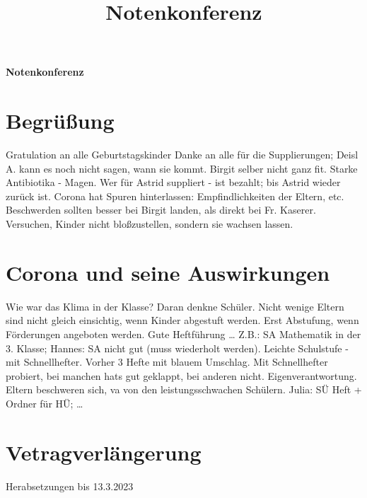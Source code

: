 \documentclass[pdftex,a4paper,12pt,bibliography=totoc]{scrartcl}
\title{Notenkonferenz}
\begin{document}
\begin{center}
 \LARGE
 \textbf{Notenkonferenz}
\end{center}

\normalsize
\section{Begrüßung}
\label{sec:org472ccbb}

Gratulation an alle Geburtstagskinder
\newline
Danke an alle für die Supplierungen; Deisl A. kann es noch nicht sagen, wann sie kommt. Birgit selber nicht ganz fit. Starke Antibiotika - Magen.
\newline
Wer für Astrid suppliert - ist bezahlt; bis Astrid wieder zurück ist.
\newline
Corona hat Spuren hinterlassen: Empfindlichkeiten der Eltern, etc. Beschwerden sollten besser bei Birgit landen, als direkt bei Fr. Kaserer. Versuchen, Kinder nicht bloßzustellen, sondern sie wachsen lassen.

\section{Corona und seine Auswirkungen}
\label{sec:orgaca8a93}
Wie war das Klima in der Klasse? Daran denkne Schüler. Nicht wenige Eltern sind nicht gleich einsichtig, wenn Kinder abgestuft werden. Erst Abstufung, wenn Förderungen angeboten werden. Gute Heftführung \ldots{}
\newline
Z.B.: SA Mathematik in der 3. Klasse; Hannes: SA nicht gut (muss wiederholt werden). Leichte Schulstufe - mit Schnellhefter. Vorher 3 Hefte mit blauem Umschlag. Mit Schnellhefter probiert, bei manchen hats gut geklappt, bei anderen nicht. Eigenverantwortung. Eltern beschweren sich, va von den leistungsschwachen Schülern.
\newline
Julia: SÜ Heft + Ordner für HÜ; \ldots{}

\section{Vetragverlängerung}
\label{sec:org02ab62b}
Herabsetzungen bis 13.3.2023 
\end{document}
